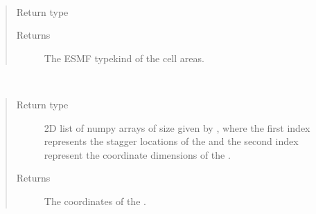 \documentclass[letterpaper,10pt,english]{sphinxmanual}
\begin{document}
\begin{fulllineitems}
\begin{fulllineitems}
\begin{quote}
\begin{description}
\end{description}\end{quote}

\end{fulllineitems}


\begin{fulllineitems}
\label{\detokenize{grid:ESMF.api.grid.Grid.areatype}}~\begin{quote}\begin{description}
\item[{Return type}] \leavevmode
{\hyperref[\detokenize{TypeKind:ESMF.api.constants.TypeKind}]{}}

\item[{Returns}] \leavevmode
The ESMF typekind of the {\hyperref[\detokenize{grid:ESMF.api.grid.Grid}]{}} cell
areas.

\end{description}\end{quote}

\end{fulllineitems}


\begin{fulllineitems}
\label{\detokenize{grid:ESMF.api.grid.Grid.coords}}~\begin{quote}\begin{description}
\item[{Return type}] \leavevmode
2D list of numpy arrays of size given by
, where the first index represents
the stagger locations of the {\hyperref[\detokenize{grid:ESMF.api.grid.Grid}]{}} and the
second index represent the coordinate dimensions of the
{\hyperref[\detokenize{grid:ESMF.api.grid.Grid}]{}}.

\item[{Returns}] \leavevmode
The coordinates of the {\hyperref[\detokenize{grid:ESMF.api.grid.Grid}]{}}.


\end{description}
\end{quote}
\end{fulllineitems}
\end{fulllineitems}
\end{document}
